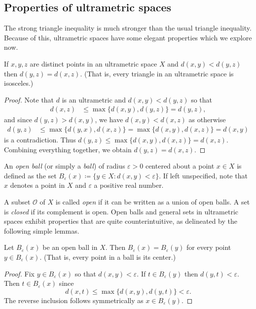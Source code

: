 \subsection{Properties of ultrametric spaces} The strong triangle inequality is much stronger than the usual triangle inequality. Because of this, ultrametric spaces have some elegant properties which we explore now.
\begin{lemma}
If \( x, y, z \) are distinct points in an ultrametric space \( X \) and \( d(x,y) < d(y,z) \) then \( d(y,z) = d(x,z) \). (That is, every triangle in an ultrametric space is isosceles.)
\end{lemma}
\begin{proof}
Note that \( d \) is an ultrametric and \( d(x,y) < d(y,z) \) so that
\begin{align*}
	d(x, z) &\leq \max \{ d(x,y), d(y, z) \} = d(y,z),
\end{align*}
and since \( d(y,z) > d(x,y) \), we have \( d(x,y) < d(x,z) \) as otherwise
\begin{align*}
	d(y,z) &\leq \max \{ d(y, x) , d(x, z) \} = \max \{ d(x,y) , d(x,z) \} = d(x,y)
\end{align*}
is a contradiction. Thus \( d(y,z) \leq \max \{ d(x,y), d(x,z) \} = d(x,z) \). Combining everything together, we obtain \( d(y,z) = d(x,z) \).
\end{proof}



An \emph{open ball} (or simply a \emph{ball}) of radius \( \varepsilon > 0 \) centered about a point \( x \in  X \) is defined as the set \( B_{\varepsilon }(x) \coloneqq \{ y \in X : d(x,y) < \varepsilon  \}  \). If left unspecified, note that \( x \) denotes a point in \( X \) and \( \varepsilon  \) a positive real number. 

A subset \( \mathcal{O}  \) of \( X \) is called \emph{open} if it can be written as a union of open balls. A set is \emph{closed} if its complement is open. Open balls and general sets in ultrametric spaces exhibit properties that are quite counterintuitive, as delineated by the following simple lemmas.
\begin{lemma}
Let \( B_{\varepsilon } (x) \) be an open ball in \( X \). Then \( B_{\varepsilon } (x) = B_{\varepsilon } (y) \) for every point \( y \in B_{\varepsilon } (x) \). (That is, every point in a ball is its center.)
\end{lemma}
\begin{proof}
Fix \( y \in B_{\varepsilon } (x) \) so that \( d(x,y) < \varepsilon  \). If \( t \in B_{\varepsilon } (y) \) then \( d(y,t) < \varepsilon  \). Then \( t \in B_{\varepsilon } (x) \) since \[ d(x, t) \leq \max \{ d(x,y), d(y,t) \} < \varepsilon . \] The reverse inclusion follows symmetrically as \( x \in B_{\varepsilon } (y) \).
\end{proof}

